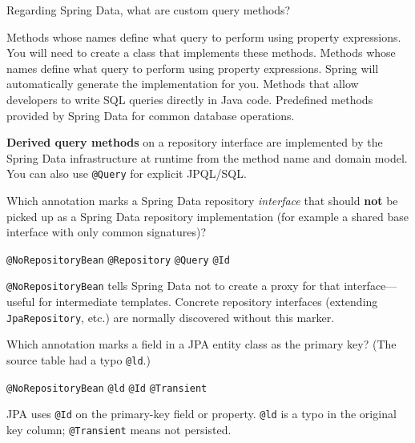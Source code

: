 \question[4]
Regarding Spring Data, what are custom query methods?
\begin{choices}
  \choice Methods whose names define what query to perform using property expressions. You will need to create a class that implements these methods.
  \CorrectChoice Methods whose names define what query to perform using property expressions. Spring will automatically generate the implementation for you.
  \choice Methods that allow developers to write SQL queries directly in Java code.
  \choice Predefined methods provided by Spring Data for common database operations.
\end{choices}
\begin{solution}
  \textbf{Derived query methods} on a repository interface are implemented by the Spring Data infrastructure at runtime from the method name and domain model. You can also use \texttt{@Query} for explicit JPQL/SQL.
\end{solution}


\question[4]
Which annotation marks a Spring Data repository \emph{interface} that should \textbf{not} be picked up as a Spring Data repository implementation (for example a shared base interface with only common signatures)?
\begin{choices}
  \CorrectChoice \texttt{@NoRepositoryBean}
  \choice \texttt{@Repository}
  \choice \texttt{@Query}
  \choice \texttt{@Id}
\end{choices}
\begin{solution}
  \texttt{@NoRepositoryBean} tells Spring Data not to create a proxy for that interface---useful for intermediate templates. Concrete repository interfaces (extending \texttt{JpaRepository}, etc.) are normally discovered without this marker.
\end{solution}

\question[4]
Which annotation marks a field in a JPA entity class as the primary key? (The source table had a typo \texttt{@ld}.)
\begin{choices}
  \choice \texttt{@NoRepositoryBean}
  \choice \texttt{@ld}
  \CorrectChoice \texttt{@Id}
  \choice \texttt{@Transient}
\end{choices}
\begin{solution}
  JPA uses \texttt{@Id} on the primary-key field or property. \texttt{@ld} is a typo in the original key column; \texttt{@Transient} means not persisted.
\end{solution}

